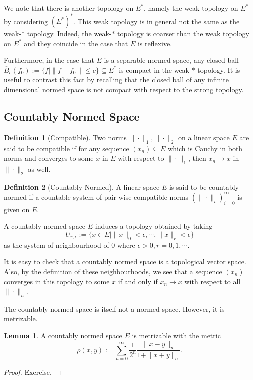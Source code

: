 \documentclass[]{article}
\theoremstyle{definition}
\theoremstyle{definition}
\newtheorem{definition}{Definition}[section]
\newtheorem{lemma}{Lemma}[section]
\begin{document}
We note that there is another topology on \(E^*\), namely the weak topology 
on \(E^*\) by considering \((E^*)^*\). This weak topology is in general not 
the same as the weak-\(*\) topology. Indeed, the weak-\(*\) topology is 
coarser than the weak topology on \(E^*\) and they coincide in the case that 
\(E\) is reflexive.

Furthermore, in the case that \(E\) is a separable normed space, any closed ball 
\(\overline{B}_c(f_0) := \{f \mid \|f - f_0\| \le c\} \subseteq E^*\) is compact 
in the weak-\(*\) topology. It is useful to contrast this fact by recalling that 
the closed ball of any infinite dimensional normed space is not compact 
with respect to the strong topology.

\subsection{Countably Normed Space}

\begin{definition}[Compatible]
  Two norms \(\|\cdot\|_1, \|\cdot\|_2\) on a linear space \(E\) are said to 
  be compatible if for any sequence \((x_n) \subseteq E\) which is Cauchy 
  in both norms and converges to some \(x\) in \(E\) with respect to \(\|\cdot\|_1\), 
  then \(x_n \to x\) in \(\|\cdot\|_2\) as well.
\end{definition}

\begin{definition}[Countably Normed]
  A linear space \(E\) is said to be countably normed if a countable system of 
  pair-wise compatible norms \((\|\cdot\|_i)_{i = 0}^\infty\) is given on 
  \(E\).

  A countably normed space \(E\) induces a topology obtained by taking 
  \[U_{r, \epsilon} := \{x \in E \mid \|x\|_0 < \epsilon, \cdots, \|x\|_r < \epsilon\}\]
  as the system of neighbourhood of 0 where \(\epsilon > 0, r = 0, 1, \cdots\).
\end{definition}

It is easy to check that a countably normed space is a topological vector space. 
Also, by the definition of these neighbourhoods, we see that a sequence \((x_n)\)
converges in this topology to some \(x\) if and only if \(x_n \to x\) with respect 
to all \(\|\cdot\|_n\).

The countably normed space is itself not a normed space. However, it is 
metrizable.

\begin{lemma}
  A countably normed space \(E\) is metrizable with the metric 
  \[\rho(x, y) := \sum_{n = 0}^\infty \frac{1}{2^n} \frac{\|x - y\|_n}{1 + \|x + y\|_n}.\]
\end{lemma}
\begin{proof}
  Exercise.
\end{proof}
\end{document}
